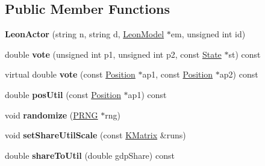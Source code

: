 \subsection*{Public Member Functions}
\begin{DoxyCompactItemize}
\item 
\hypertarget{class_demo_leon_1_1_leon_actor_a0054990f5868d0dea8e12ef966f4fe2c}{{\bfseries Leon\-Actor} (string n, string d, \hyperlink{class_demo_leon_1_1_leon_model}{Leon\-Model} $\ast$em, unsigned int id)}\label{class_demo_leon_1_1_leon_actor_a0054990f5868d0dea8e12ef966f4fe2c}

\item 
\hypertarget{class_demo_leon_1_1_leon_actor_a13dd6848a40e992cb2069bc164dde5cf}{double {\bfseries vote} (unsigned int p1, unsigned int p2, const \hyperlink{class_k_base_1_1_state}{State} $\ast$st) const }\label{class_demo_leon_1_1_leon_actor_a13dd6848a40e992cb2069bc164dde5cf}

\item 
\hypertarget{class_demo_leon_1_1_leon_actor_a341c8116a91ea3afa471e06bbc7626c7}{virtual double {\bfseries vote} (const \hyperlink{class_k_base_1_1_position}{Position} $\ast$ap1, const \hyperlink{class_k_base_1_1_position}{Position} $\ast$ap2) const }\label{class_demo_leon_1_1_leon_actor_a341c8116a91ea3afa471e06bbc7626c7}

\item 
\hypertarget{class_demo_leon_1_1_leon_actor_a4612b58cdb17479cf6011e8c136a1db6}{double {\bfseries pos\-Util} (const \hyperlink{class_k_base_1_1_position}{Position} $\ast$ap1) const }\label{class_demo_leon_1_1_leon_actor_a4612b58cdb17479cf6011e8c136a1db6}

\item 
\hypertarget{class_demo_leon_1_1_leon_actor_a78efd485a0d57e34f16cd05484a6d59c}{void {\bfseries randomize} (\hyperlink{class_k_base_1_1_p_r_n_g}{P\-R\-N\-G} $\ast$rng)}\label{class_demo_leon_1_1_leon_actor_a78efd485a0d57e34f16cd05484a6d59c}

\item 
\hypertarget{class_demo_leon_1_1_leon_actor_a35ce90dd1d5a1f05f1dccd0a5044e2c1}{void {\bfseries set\-Share\-Util\-Scale} (const \hyperlink{class_k_base_1_1_k_matrix}{K\-Matrix} \&runs)}\label{class_demo_leon_1_1_leon_actor_a35ce90dd1d5a1f05f1dccd0a5044e2c1}

\item 
\hypertarget{class_demo_leon_1_1_leon_actor_a272c77831077d3ed3b520eb655e06d84}{double {\bfseries share\-To\-Util} (double gdp\-Share) const }\label{class_demo_leon_1_1_leon_actor_a272c77831077d3ed3b520eb655e06d84}

\end{DoxyCompactItemize}

